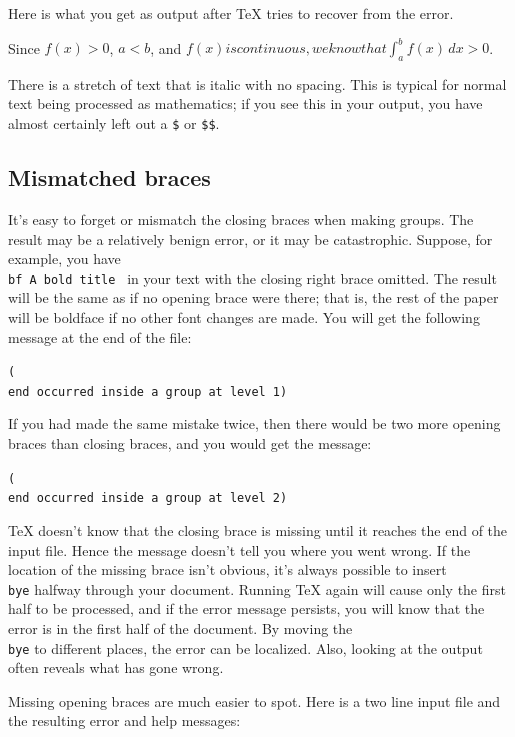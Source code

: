 Here is what you get as output after \TeX{} tries to recover from 
the error. 

Since $f(x) > 0$, $a<b$,  and $f(x) is continuous, we know that 
\int_a^b f(x)\,dx >0$. 

There is a stretch of text that is italic with no spacing.  This 
is typical for normal text being processed as mathematics; if you 
see this in your output, you have almost certainly left out a 
{\tt \$} or {\tt \$\$}. 

\subsection{Mismatched braces} 

It's easy to forget or mismatch the closing braces when making 
groups.  The result may be a relatively benign error, or it may 
be catastrophic. Suppose, for example, you have {\tt \lb\\bf A 
bold title } in your text with the closing right brace omitted. 
The result will be the same as if no opening brace were there; 
that is, the rest of the paper will be boldface if no other font 
changes are made.  You will get the following message at the end 
of the file: 

{\tt (\\end occurred inside a group at level 1)} 

If you had made the same mistake twice, then there would be two 
more opening braces than closing braces, and you would get the 
message: 

{\tt (\\end occurred inside a group at level 2)} 

\TeX{} doesn't know that the closing brace is missing until it 
reaches the end of the input file.  Hence the message doesn't 
tell you where you went wrong.  If the location of the missing 
brace isn't obvious, it's always possible to insert {\tt \\bye} 
halfway through your document.  Running \TeX{} again will cause 
only the first half to be processed, and if the error message 
persists, you will know that the error is in the first half of 
the document.  By moving the {\tt \\bye} to different places, the 
error can be localized.  Also, looking at the output often 
reveals what has gone wrong. 

Missing opening braces are much easier to spot.  Here is a two 
line input file and the resulting error and help messages: 

